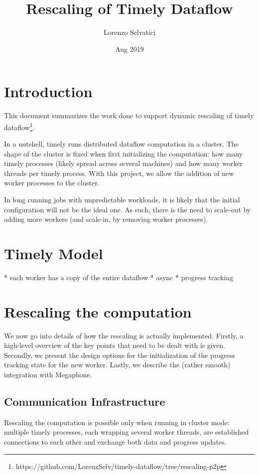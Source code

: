 \documentclass[12pt]{extarticle}
\title{Rescaling of Timely Dataflow}
\author{Lorenzo Selvatici}
\date{Aug 2019}
\begin{document}
\maketitle

\section{Introduction}

This document summarizes the work done to support dynamic rescaling of timely dataflow\footnote{https://github.com/LorenzSelv/timely-dataflow/tree/rescaling-p2p}.

In a nutshell, timely runs distributed dataflow computation in a cluster. The shape of the cluster is fixed
when first initializing the computation: how many timely processes (likely spread across several machines) and how many worker threads per timely process.
With this project, we allow the addition of new worker processes to the cluster.

In long running jobs with unpredictable workloads, it is likely that the initial configuration will not be the ideal one.
As such, there is the need to scale-out by adding more workers (and scale-in, by removing worker processes).

\section{Timely Model}

* each worker has a copy of the entire dataflow
* async
* progress tracking

\section{Rescaling the computation}

We now go into details of how the rescaling is actually implemented.
Firstly, a high-level overview of the key points that need to be dealt with is given.
Secondly, we present the design options for the initialization of the progress tracking state for the new worker.
Lastly, we describe the (rather smooth) integration with Megaphone.

\subsection{Communication Infrastructure}

Rescaling the computation is possible only when running in cluster mode: multiple timely processes, each wrapping several worker
threads, are established connections to each other and exchange both data and progress updates.
\end{document}
